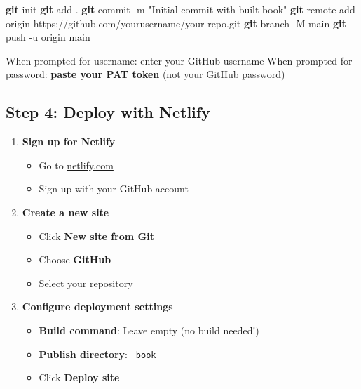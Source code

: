 \documentclass[
]{book}
\newenvironment{Shaded}{\begin{snugshade}}{\end{snugshade}}
\newcommand{\AttributeTok}[1]{\textcolor[rgb]{0.13,0.29,0.53}{#1}}
\newcommand{\FunctionTok}[1]{\textcolor[rgb]{0.13,0.29,0.53}{\textbf{#1}}}
\newcommand{\NormalTok}[1]{#1}
\newcommand{\StringTok}[1]{\textcolor[rgb]{0.31,0.60,0.02}{#1}}
\providecommand{\tightlist}{%
  \setlength{\itemsep}{0pt}\setlength{\parskip}{0pt}}
\begin{document}
\begin{enumerate}
\begin{Shaded}
\begin{Highlighting}[]
\FunctionTok{git}\NormalTok{ init}
\FunctionTok{git}\NormalTok{ add .}
\FunctionTok{git}\NormalTok{ commit }\AttributeTok{{-}m} \StringTok{"Initial commit with built book"}
\FunctionTok{git}\NormalTok{ remote add origin https://github.com/yourusername/your{-}repo.git}
\FunctionTok{git}\NormalTok{ branch }\AttributeTok{{-}M}\NormalTok{ main}
\FunctionTok{git}\NormalTok{ push }\AttributeTok{{-}u}\NormalTok{ origin main}
\end{Highlighting}
\end{Shaded}

  When prompted for username: enter your GitHub username
  When prompted for password: \textbf{paste your PAT token} (not your GitHub password)
\end{enumerate}

\subsection{Step 4: Deploy with Netlify}\label{step-4-deploy-with-netlify}

\begin{enumerate}
\def\labelenumi{\arabic{enumi}.}
\tightlist
\item
  \textbf{Sign up for Netlify}

  \begin{itemize}
  \tightlist
  \item
    Go to \href{https://netlify.com}{netlify.com}
  \item
    Sign up with your GitHub account
  \end{itemize}
\item
  \textbf{Create a new site}

  \begin{itemize}
  \tightlist
  \item
    Click \textbf{New site from Git}
  \item
    Choose \textbf{GitHub}
  \item
    Select your repository
  \end{itemize}
\item
  \textbf{Configure deployment settings}

  \begin{itemize}
  \tightlist
  \item
    \textbf{Build command}: Leave empty (no build needed!)
  \item
    \textbf{Publish directory}: \texttt{\_book}
  \item
    Click \textbf{Deploy site}
  \end{itemize}
\end{enumerate}
\end{document}
